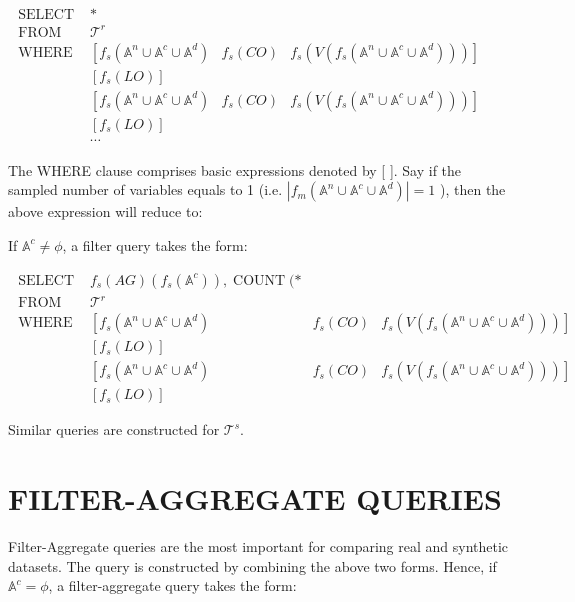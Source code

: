 \documentclass[10pt]{article}
\begin{document}
$\begin{array}{llll}\text { SELECT } & * & & \\ \text { FROM } & \mathcal{T}^{r} \\ \text { WHERE } & {\left[f_{s}\left(\mathbb{A}^{n} \cup \mathbb{A}^{c} \cup \mathbb{A}^{d}\right)\right.} & f_{s}(C O) & \left.f_{s}\left(V\left(f_{s}\left(\mathbb{A}^{n} \cup \mathbb{A}^{c} \cup \mathbb{A}^{d}\right)\right)\right)\right] \\ & {\left[f_{s}(L O)\right]} & \\ & {\left[f_{s}\left(\mathbb{A}^{n} \cup \mathbb{A}^{c} \cup \mathbb{A}^{d}\right)\right.} & f_{s}(C O) & \left.f_{s}\left(V\left(f_{s}\left(\mathbb{A}^{n} \cup \mathbb{A}^{c} \cup \mathbb{A}^{d}\right)\right)\right)\right] \\ & {\left[f_{s}(L O)\right]} & & \\ & \cdots\end{array}$

The WHERE clause comprises basic expressions denoted by [ ]. Say if the sampled number of variables equals to 1 (i.e. $\left|f_{m}\left(\mathbb{A}^{n} \cup \mathbb{A}^{c} \cup \mathbb{A}^{d}\right)\right|=1$ ), then the above expression will reduce to:



If $\mathbb{A}^{c} \neq \phi$, a filter query takes the form:

$\begin{array}{llll}\text { SELECT } & f_{s}(A G)\left(f_{s}\left(\mathbb{A}^{c}\right)\right), \operatorname{COUNT}(* & \\ \text { FROM } & \mathcal{T}^{r} \\ \text { WHERE } & {\left[f_{s}\left(\mathbb{A}^{n} \cup \mathbb{A}^{c} \cup \mathbb{A}^{d}\right)\right.} & f_{s}(C O) & \left.f_{s}\left(V\left(f_{s}\left(\mathbb{A}^{n} \cup \mathbb{A}^{c} \cup \mathbb{A}^{d}\right)\right)\right)\right] \\ & {\left[f_{s}(L O)\right]} & \\ & {\left[f_{s}\left(\mathbb{A}^{n} \cup \mathbb{A}^{c} \cup \mathbb{A}^{d}\right)\right.} & f_{s}(C O) & \left.f_{s}\left(V\left(f_{s}\left(\mathbb{A}^{n} \cup \mathbb{A}^{c} \cup \mathbb{A}^{d}\right)\right)\right)\right] \\ & {\left[f_{s}(L O)\right]} & \end{array}$

Similar queries are constructed for $\mathcal{T}^{s}$.

\section{FILTER-AGGREGATE QUERIES}
Filter-Aggregate queries are the most important for comparing real and synthetic datasets. The query is constructed by combining the above two forms. Hence, if $\mathbb{A}^{c}=\phi$, a filter-aggregate query takes the form:
\end{document}
